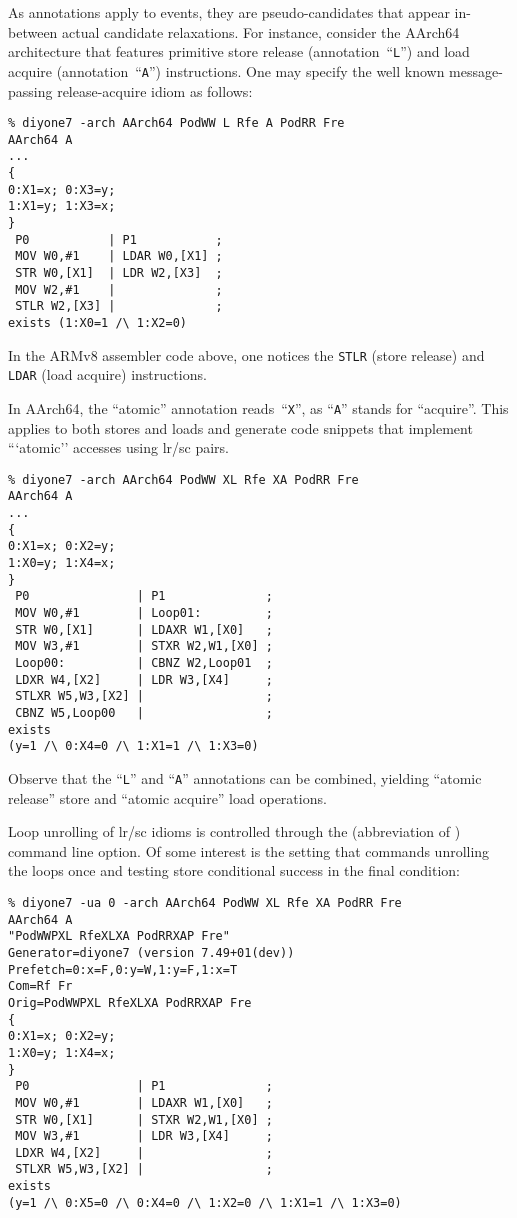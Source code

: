 As annotations apply to events, they are  pseudo-candidates that
appear in-between actual candidate relaxations. For instance, consider
the AArch64 architecture that features primitive store release
(annotation~``\texttt{L}'')
and load acquire (annotation~``\texttt{A}'') instructions.
One may specify the well known message-passing
release-acquire idiom as follows:
\begin{verbatim}
% diyone7 -arch AArch64 PodWW L Rfe A PodRR Fre
AArch64 A
...
{
0:X1=x; 0:X3=y;
1:X1=y; 1:X3=x;
}
 P0           | P1           ;
 MOV W0,#1    | LDAR W0,[X1] ;
 STR W0,[X1]  | LDR W2,[X3]  ;
 MOV W2,#1    |              ;
 STLR W2,[X3] |              ;
exists (1:X0=1 /\ 1:X2=0)
\end{verbatim}
In the ARMv8 assembler code above, one notices the \texttt{STLR} (store release)
and \texttt{LDAR} (load acquire) instructions.

In AArch64, the ``atomic'' annotation reads~``\texttt{X}'', as ``\texttt{A}''
stands for ``acquire''. This applies to both stores and loads and generate
code snippets that implement ```atomic'' accesses using
lr/sc pairs.
\begin{verbatim}
% diyone7 -arch AArch64 PodWW XL Rfe XA PodRR Fre
AArch64 A
...
{
0:X1=x; 0:X2=y;
1:X0=y; 1:X4=x;
}
 P0               | P1              ;
 MOV W0,#1        | Loop01:         ;
 STR W0,[X1]      | LDAXR W1,[X0]   ;
 MOV W3,#1        | STXR W2,W1,[X0] ;
 Loop00:          | CBNZ W2,Loop01  ;
 LDXR W4,[X2]     | LDR W3,[X4]     ;
 STLXR W5,W3,[X2] |                 ;
 CBNZ W5,Loop00   |                 ;
exists
(y=1 /\ 0:X4=0 /\ 1:X1=1 /\ 1:X3=0)
\end{verbatim}
Observe that the ``\texttt{L}'' and ``\texttt{A}'' annotations can
be combined, yielding ``atomic release'' store and ``atomic acquire'' load
operations.


\label{unroll:example}Loop unrolling of lr/sc idioms is controlled
through the  (abbreviation of ) command line option. Of some interest is the setting  that commands unrolling the loops once and
testing store conditional  success in the final condition:
\begin{verbatim}
% diyone7 -ua 0 -arch AArch64 PodWW XL Rfe XA PodRR Fre
AArch64 A
"PodWWPXL RfeXLXA PodRRXAP Fre"
Generator=diyone7 (version 7.49+01(dev))
Prefetch=0:x=F,0:y=W,1:y=F,1:x=T
Com=Rf Fr
Orig=PodWWPXL RfeXLXA PodRRXAP Fre
{
0:X1=x; 0:X2=y;
1:X0=y; 1:X4=x;
}
 P0               | P1              ;
 MOV W0,#1        | LDAXR W1,[X0]   ;
 STR W0,[X1]      | STXR W2,W1,[X0] ;
 MOV W3,#1        | LDR W3,[X4]     ;
 LDXR W4,[X2]     |                 ;
 STLXR W5,W3,[X2] |                 ;
exists
(y=1 /\ 0:X5=0 /\ 0:X4=0 /\ 1:X2=0 /\ 1:X1=1 /\ 1:X3=0)
\end{verbatim}

